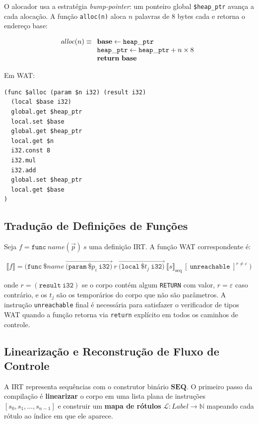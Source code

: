 O alocador usa a estratégia \emph{bump-pointer}: um ponteiro global
\texttt{\$heap\_ptr} avança a cada alocação.  A função \texttt{alloc(n)}
aloca $n$ palavras de 8 bytes cada e retorna o endereço base:

\[
  \mathit{alloc}(n) \equiv
  \begin{array}[t]{l}
    \mathbf{base} \leftarrow \mathtt{heap\_ptr} \\
    \mathtt{heap\_ptr} \leftarrow \mathtt{heap\_ptr} + n \times 8 \\
    \mathbf{return}\ \mathbf{base}
  \end{array}
\]

Em WAT:

\begin{verbatim}
(func $alloc (param $n i32) (result i32)
  (local $base i32)
  global.get $heap_ptr
  local.set $base
  global.get $heap_ptr
  local.get $n
  i32.const 8
  i32.mul
  i32.add
  global.set $heap_ptr
  local.get $base
)
\end{verbatim}

\subsection{Tradução de Definições de Funções}

Seja $f = \mathtt{func}\ \mathit{name}(\vec{p})\ s$ uma definição IRT.  A
função WAT correspondente é:

\[
\llbracket f \rrbracket =
  \mathtt{(func}\ \$\mathit{name}\ \vec{\mathtt{(param}\ \$p_i\ \mathtt{i32)}}\ r\
  \vec{\mathtt{(local}\ \$t_j\ \mathtt{i32)}}\ \llbracket s \rrbracket_{\text{seq}}\
  [\ \mathtt{unreachable}\ ]^{r \neq \varepsilon}\ \mathtt{)}
\]

onde $r = \mathtt{(result\ i32)}$ se o corpo contém algum \texttt{RETURN} com
valor, $r = \varepsilon$ caso contrário, e os $t_j$ são os temporários do corpo
que não são parâmetros.  A instrução \texttt{unreachable} final é necessária
para satisfazer o verificador de tipos WAT quando a função retorna via
\texttt{return} explícito em todos os caminhos de controle.

\subsection{Linearização e Reconstrução de Fluxo de Controle}

A IRT representa sequências com o construtor binário $\mathbf{SEQ}$.  O
primeiro passo da compilação é \textbf{linearizar} o corpo em uma lista plana
de instruções $[s_0, s_1, \ldots, s_{n-1}]$ e construir um \textbf{mapa de
rótulos} $\mathcal{L} : \mathit{Label} \to \mathbb{N}$ mapeando cada rótulo ao
índice em que ele aparece.

